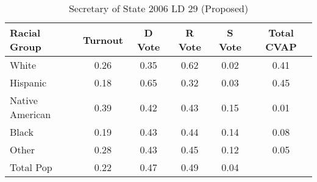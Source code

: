 \begin{table}[htb]
\begin{center}
\caption{Secretary of State 2006 LD 29 (Proposed)}
\label{sos06_cvap_ld_29}
\begin{tabular}{lccccc}
  \hline
Racial Group & Turnout & D Vote & R Vote & S Vote & Total CVAP \\ 
  \hline
White & 0.26 & 0.35 & 0.62 & 0.02 & 0.41 \\ 
  Hispanic & 0.18 & 0.65 & 0.32 & 0.03 & 0.45 \\ 
  Native American & 0.39 & 0.42 & 0.43 & 0.15 & 0.01 \\ 
  Black & 0.19 & 0.43 & 0.44 & 0.14 & 0.08 \\ 
  Other & 0.28 & 0.43 & 0.45 & 0.12 & 0.05 \\ 
  Total Pop & 0.22 & 0.47 & 0.49 & 0.04 &  \\ 
   \hline
\end{tabular}
\end{center}
\end{table}
